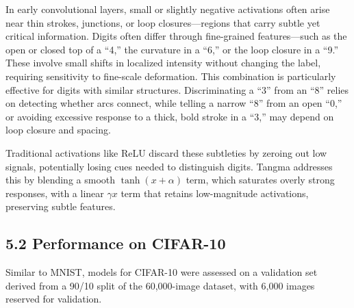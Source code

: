 \documentclass{article}
\begin{document}
\vspace{4pt}
\noindent
In early convolutional layers, small or slightly negative activations often arise near thin strokes, junctions, or loop closures---regions that carry subtle yet critical information. Digits often differ through fine-grained features---such as the open or closed top of a ``4,'' the curvature in a ``6,'' or the loop closure in a ``9.'' These involve small shifts in localized intensity without changing the label, requiring sensitivity to fine-scale deformation. This combination is particularly effective for digits with similar structures. Discriminating a ``3'' from an ``8'' relies on detecting whether arcs connect, while telling a narrow ``8'' from an open ``0,'' or avoiding excessive response to a thick, bold stroke in a ``3,'' may depend on loop closure and spacing.


\vspace{4pt}
\noindent
Traditional activations like ReLU discard these subtleties by zeroing out low signals, potentially losing cues needed to distinguish digits. Tangma addresses this by blending a smooth $\tanh(x + \alpha)$ term, which saturates overly strong responses, with a linear $\gamma x$ term that retains low-magnitude activations, preserving subtle features.













































\subsection*{5.2 Performance on CIFAR-10}
Similar to MNIST, models for CIFAR-10 were assessed on a validation set derived from a 90/10 split of the 60,000-image dataset, with 6,000 images reserved for validation.
\end{document}

